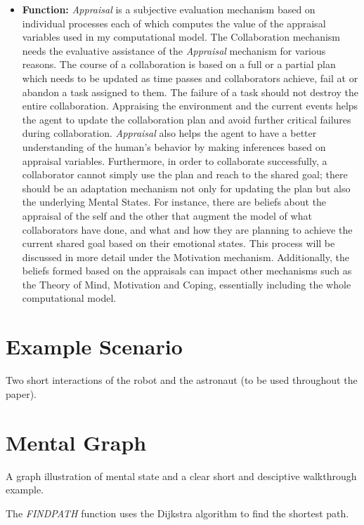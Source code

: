 \documentclass[letterpaper]{article}
\begin{document}
\begin{itemize}
  \item \textbf{Function:} \textit{Appraisal} is a subjective evaluation
  mechanism based on individual processes each of which computes the value of
  the appraisal variables used in my computational model. The Collaboration
  mechanism needs the evaluative assistance of the \textit{Appraisal} mechanism
  for various reasons. The course of a collaboration is based on a full or a
  partial plan which needs to be updated as time passes and collaborators
  achieve, fail at or abandon a task assigned to them. The failure of a task
  should not destroy the entire collaboration. Appraising the environment and
  the current events helps the agent to update the collaboration plan and avoid
  further critical failures during collaboration. \textit{Appraisal} also helps
  the agent to have a better understanding of the human's behavior by making
  inferences based on appraisal variables. Furthermore, in order to collaborate
  successfully, a collaborator cannot simply use the plan and reach to the
  shared goal; there should be an adaptation mechanism not only for updating the
  plan but also the underlying Mental States. For instance, there are beliefs
  about the appraisal of the self and the other that augment the model of what
  collaborators have done, and what and how they are planning to achieve the
  current shared goal based on their emotional states. This process will be
  discussed in more detail under the Motivation mechanism. Additionally, the
  beliefs formed based on the appraisals can impact other mechanisms such as the
  Theory of Mind, Motivation and Coping, essentially including the whole
  computational model.
\end{itemize}

\section{Example Scenario}

Two short interactions of the robot and the astronaut (to be used throughout
the paper).

\section{Mental Graph}
\label{sec:mental-graph}

A graph illustration of mental state and a clear short and desciptive
walkthrough example.

The \textit{F{\fontsize{8}{8}\selectfont IND}P{\fontsize{8}{8}\selectfont ATH}}
function uses the Dijkstra algorithm to find the shortest path.
\end{document}
